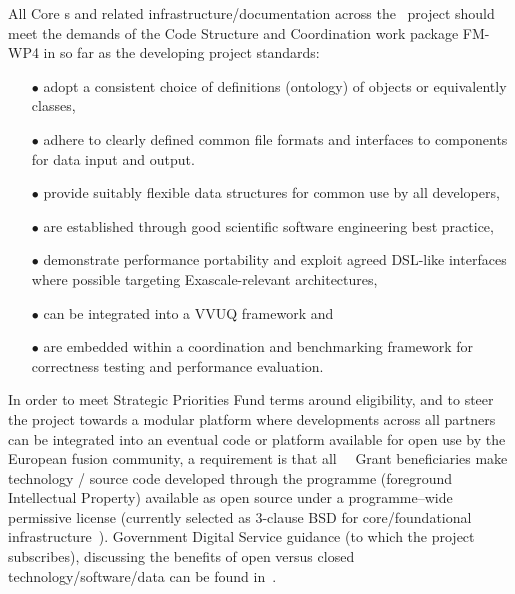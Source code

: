 All Core \Papp s and related infrastructure/documentation 
across the \nep \   project should meet the demands of the Code Structure and 
Coordination work package FM-WP4 in so far as the developing project standards:
\begin{itemize}
\item[$\bullet$] adopt a consistent choice of definitions (ontology) of 
objects or equivalently classes,
\item[$\bullet$] adhere to clearly defined common file formats and 
interfaces to components for data input and output.
\item[$\bullet$] provide suitably flexible data structures for common 
use by all developers,
\item[$\bullet$] are established through good scientific software 
engineering best practice,
\item[$\bullet$] demonstrate performance portability and exploit agreed 
DSL-like interfaces where possible targeting Exascale-relevant architectures,
\item[$\bullet$] can be integrated into a VVUQ framework and
\item[$\bullet$] are embedded within a coordination and benchmarking 
framework for correctness testing and performance evaluation.
\end{itemize}

In order to meet Strategic Priorities Fund terms around eligibility, 
and to steer the project towards a modular platform where developments 
across all partners can be integrated into an eventual code or platform 
available for open use by the European fusion community, a requirement 
is that all \exc \ \nep \ Grant beneficiaries make technology / source 
code developed through the programme (foreground Intellectual Property) available as open 
source under a programme--wide permissive license (currently selected as 
3-clause BSD for core/foundational infrastructure~\cite{bsd3clause}). Government 
Digital Service guidance (to which the project subscribes), discussing 
the benefits of open versus closed technology/software/data can be found 
in~\cite{os,os2}.
